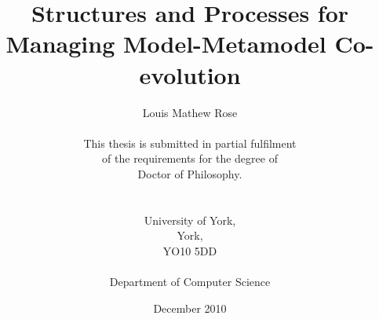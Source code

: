 \title{Structures and Processes for Managing Model-Metamodel Co-evolution}
\author{Louis Mathew Rose \\ \\
This thesis is submitted in partial fulfilment \\
of the requirements for the degree of \\
Doctor of Philosophy. \\
\\ \\
University of York, \\
York, \\ 
YO10 5DD \\
\\
Department of Computer Science \\ }
\date{December 2010}